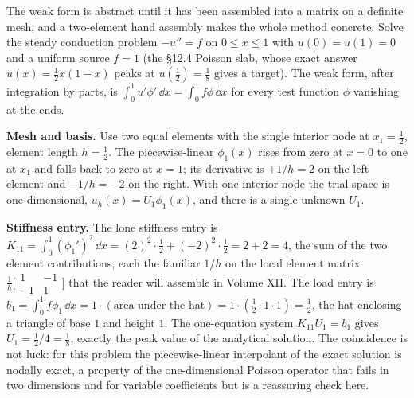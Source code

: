 \begin{mastery}
The weak form is abstract until it has been assembled into a matrix
on a definite mesh, and a two-element hand assembly makes the whole
method concrete. Solve the steady conduction problem $-u'' = f$ on
$0 \leq x \leq 1$ with $u(0) = u(1) = 0$ and a uniform source $f = 1$
(the §12.4 Poisson slab, whose exact answer $u(x) = \tfrac{1}{2}
x(1-x)$ peaks at $u(\tfrac{1}{2}) = \tfrac{1}{8}$ gives a target).
The weak form, after integration by parts, is $\int_{0}^{1} u'\phi'
\,\dd x = \int_{0}^{1} f\phi\,\dd x$ for every test function $\phi$
vanishing at the ends.

\textbf{Mesh and basis.} Use two equal elements with the single
interior node at $x_{1} = \tfrac{1}{2}$, element length $h =
\tfrac{1}{2}$. The piecewise-linear 
$\phi_{1}(x)$ rises from zero at $x = 0$ to one at $x_{1}$ and falls
back to zero at $x = 1$; its derivative is $+1/h = 2$ on the left
element and $-1/h = -2$ on the right. With one interior node the
trial space is one-dimensional, $u_{h}(x) = U_{1}\phi_{1}(x)$, and
there is a single unknown $U_{1}$.

\textbf{Stiffness entry.} The lone stiffness entry is $K_{11} =
\int_{0}^{1}(\phi_{1}')^{2}\,\dd x = (2)^{2}\cdot\tfrac{1}{2} +
(-2)^{2}\cdot\tfrac{1}{2} = 2 + 2 = 4$, the sum of the two element
contributions, each the familiar $1/h$ on the local element matrix
$\tfrac{1}{h}\bigl[\begin{smallmatrix} 1 & -1 \\ -1 & 1
\end{smallmatrix}\bigr]$ that the reader will assemble in Volume XII.
The load entry is $b_{1} = \int_{0}^{1} f\phi_{1}\,\dd x = 1\cdot
(\text{area under the hat}) = 1\cdot(\tfrac{1}{2}\cdot 1 \cdot 1)
= \tfrac{1}{2}$, the hat enclosing a triangle of base $1$ and
height $1$. The one-equation system $K_{11}U_{1} = b_{1}$ gives
$U_{1} = \tfrac{1}{2}/4 = \tfrac{1}{8}$, exactly the peak value of
the analytical solution. The coincidence is not luck: for this
problem the piecewise-linear interpolant of the exact solution is
nodally exact, a property of the one-dimensional Poisson operator
that fails in two dimensions and for variable coefficients but is a
reassuring check here.


\end{mastery}
